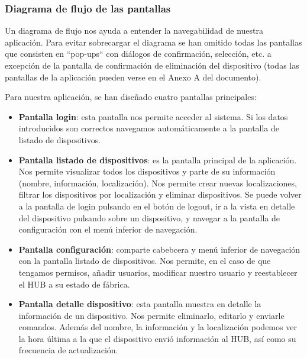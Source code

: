 \subsubsection{Diagrama de flujo de las pantallas}
Un diagrama de flujo nos ayuda a entender la navegabilidad de nuestra aplicación. Para evitar sobrecargar el diagrama se han omitido todas
las pantallas que consisten en ``pop-ups`` con diálogos de confirmación, selección, etc. a excepción de la pantalla de confirmación de eliminación del
dispositivo (todas las pantallas de la aplicación pueden verse en el Anexo A del documento).
\par
Para nuestra aplicación, se han diseñado cuatro pantallas principales:
\begin{itemize}
\item\textbf{Pantalla login}: esta pantalla nos permite acceder al sistema. Si los datos introducidos son correctos navegamos automáticamente 
a la pantalla de listado de dispositivos.
\item\textbf{Pantalla listado de dispositivos}: es la pantalla principal de la aplicación. Nos permite visualizar todos los dispositivos y parte
de su información (nombre, información, localización). Nos permite crear nuevas localizaciones, filtrar los dispositivos por localización y eliminar
dispositivos. Se puede volver a la pantalla de login pulsando en el botón de logout, ir a la vista en detalle del dispositivo pulsando sobre un
dispositivo, y navegar a la pantalla de configuración con el menú inferior de navegación.
\item\textbf{Pantalla configuración}: comparte cabebcera y menú inferior de navegación con la pantalla listado de dispositivos. Nos permite, en el
caso de que tengamos permisos, añadir usuarios, modificar nuestro usuario y reestablecer el HUB a su estado de fábrica.
\item\textbf{Pantalla detalle dispositivo}: esta pantalla muestra en detalle la información de un dispositivo. Nos permite eliminarlo, editarlo y
enviarle comandos. Además del nombre, la información y la localización podemos ver la hora última a la que el dispositivo envió información al HUB,
así como su frecuencia de actualización.
\end{itemize}
